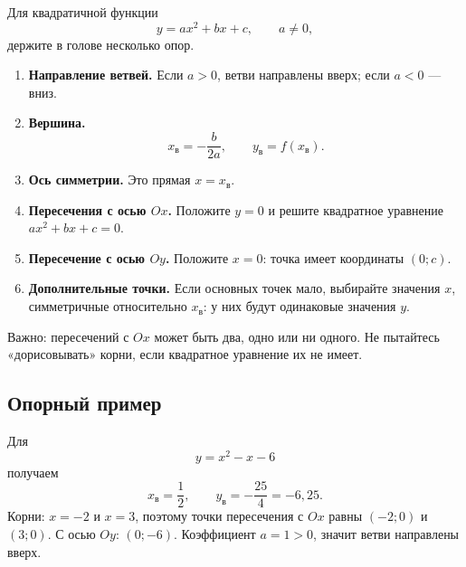 \documentclass[a4paper,12pt]{article}
\newcommand{\key}[1]{\textcolor{darkaccent}{\textbf{#1}}}
\newcommand{\smallnote}[1]{\textcolor{softgray}{\small #1}}
\begin{document}
Для квадратичной функции
\[
  y=ax^2+bx+c,\qquad a\ne0,
\]
держите в голове несколько опор.

\begin{enumerate}
  \item \key{Направление ветвей.} Если $a>0$, ветви направлены вверх; если $a<0$ --- вниз.
  \item \key{Вершина.}
  \[
    x_{\text{в}}=-\frac{b}{2a},\qquad y_{\text{в}}=f(x_{\text{в}}).
  \]
  \item \key{Ось симметрии.} Это прямая $x=x_{\text{в}}$.
  \item \key{Пересечения с осью $Ox$.} Положите $y=0$ и решите квадратное уравнение $ax^2+bx+c=0$.
  \item \key{Пересечение с осью $Oy$.} Положите $x=0$: точка имеет координаты $(0;c)$.
  \item \key{Дополнительные точки.} Если основных точек мало, выбирайте значения $x$, симметричные относительно $x_{\text{в}}$: у них будут одинаковые значения $y$.
\end{enumerate}

\smallnote{Важно: пересечений с $Ox$ может быть два, одно или ни одного. Не пытайтесь «дорисовывать» корни, если квадратное уравнение их не имеет.}

\subsection*{Опорный пример}
Для
\[
  y=x^2-x-6
\]
получаем
\[
  x_{\text{в}}=\frac12,\qquad y_{\text{в}}=-\frac{25}{4}=-6{,}25.
\]
Корни: $x=-2$ и $x=3$, поэтому точки пересечения с $Ox$ равны $(-2;0)$ и $(3;0)$. С осью $Oy$: $(0;-6)$. Коэффициент $a=1>0$, значит ветви направлены вверх.

\begin{center}
\end{center}
\end{document}
